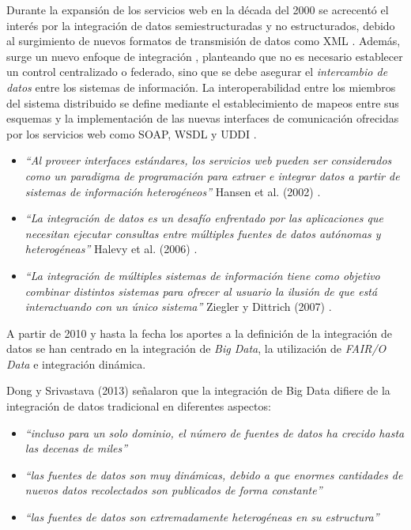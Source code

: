 Durante la expansión de los servicios web en la década del 2000 se acrecentó el interés por la integración
de datos semiestructuradas y no estructurados, debido al surgimiento de nuevos formatos de transmisión
de datos como XML \cite{bourret1999xml}. Además, surge un nuevo enfoque de integración \cite{miller2018open}, planteando
que no es necesario establecer un control centralizado o federado, sino 
que se debe asegurar el \textit{intercambio de datos}
entre los sistemas de información. La interoperabilidad entre los miembros
del sistema distribuido se define mediante el establecimiento de mapeos entre sus esquemas y la implementación de las nuevas interfaces de comunicación ofrecidas por los servicios web como SOAP, WSDL y UDDI \cite{curbera2002soap}.

\begin{itemize}
    \item \textit{``Al proveer interfaces estándares, los servicios web pueden ser considerados como un paradigma de 
    programación para extraer e integrar datos a partir de sistemas de información heterogéneos''} Hansen et al. (2002) \cite{hansen2002data}.
    
    \item \textit{``La integración de datos es un desafío enfrentado por las aplicaciones que necesitan
    ejecutar consultas entre múltiples fuentes de datos autónomas y heterogéneas''} Halevy et al. (2006) \cite{halevy2006data}. 
    
    \item \textit{``La integración de múltiples sistemas de información tiene como objetivo combinar distintos sistemas para ofrecer
    al usuario la ilusión de que está interactuando con un único sistema''}  Ziegler y Dittrich (2007) \cite{ziegler2007data}.

\end{itemize}

A partir de 2010 y hasta la fecha los aportes a la definición de la integración de datos se han
centrado en la integración de \textit{Big Data}, la utilización de \textit{FAIR/O Data} e integración dinámica.

Dong y Srivastava (2013) \cite{dong2013big} señalaron que la integración de Big Data difiere de la integración
de datos tradicional en diferentes aspectos:
    \begin{itemize}
        \item \textit{``incluso para un solo dominio, el número de fuentes de datos ha crecido hasta las decenas de miles''}
        \item \textit{``las fuentes de datos son muy dinámicas, debido a que enormes cantidades de nuevos datos recolectados son
        publicados de forma constante''}
        \item \textit{``las fuentes de datos son extremadamente heterogéneas en su estructura''}
    \end{itemize}

